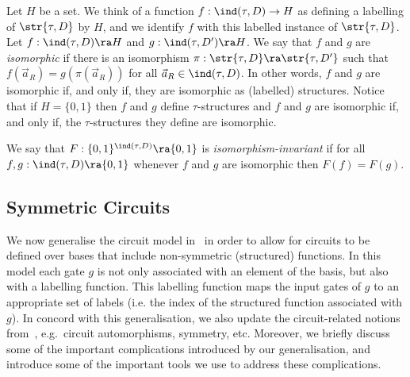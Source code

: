 \documentclass[a4paper,UKenglish]{lipics-v2018}
\begin{document}
Let $H$ be a set. We think of a function $f : \ind(\tau, D)  \rightarrow H$ as defining a
labelling of $\str{\tau,D}$ by $H$, and we identify $f$ with this labelled
instance of $\str{\tau, D}$. Let $f: \ind(\tau, D) \ra H$ and $g : \ind (\tau,
D') \ra H$. We say that $f$ and $g$ are \emph{isomorphic} if there is an
isomorphism $\pi : \str{\tau, D} \ra \str{\tau, D'}$ such that $f(\vec{a}_R) =
g(\pi(\vec{a}_R))$ for all $\vec{a}_R \in \ind(\tau, D)$. In other words, $f$
and $g$ are isomorphic if, and only if, they are isomorphic as (labelled)
structures. Notice that if $H = \{0,1\}$ then $f$ and $g$ define
$\tau$-structures and $f$ and $g$ are isomorphic if, and only if, the
$\tau$-structures they define are isomorphic.

We say that $F : \{0,1\}^{\ind(\tau,D)} \ra \{0,1\}$ is
\emph{isomorphism-invariant} if for all $f, g : \ind(\tau, D) \ra \{0,1\}$
whenever $f$ and $g$ are isomorphic then $F(f) = F(g)$.

\subsection{Symmetric Circuits}
We now generalise the circuit model in~\cite{AndersonD17} in order to
allow for circuits to be defined over bases that include non-symmetric
(structured) functions. In this model each gate $g$ is not only associated with
an element of the basis, but also with a labelling function. This labelling
function maps the input gates of $g$ to an appropriate set of labels (i.e. the
index of the structured function associated with $g$). In concord with this
generalisation, we also update the circuit-related notions from~\cite{AndersonD17}, e.g.\ circuit automorphisms, symmetry, etc.
Moreover, we briefly discuss some of the important complications introduced by
our generalisation, and introduce some of the important tools we use to
address these complications.
\end{document}

